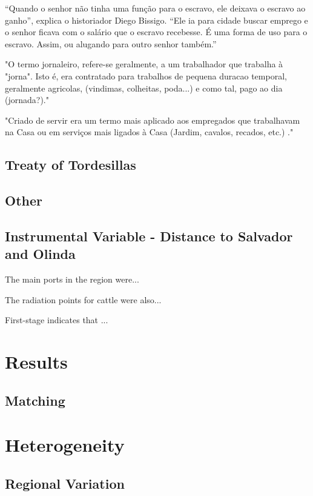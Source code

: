 \documentclass{article}
\begin{document}
“Quando o senhor não tinha uma função para o escravo, ele deixava o escravo ao ganho”, explica o historiador Diego Bissigo. “Ele ia para cidade buscar emprego e o senhor ficava com o salário que o escravo recebesse. É uma forma de uso para o escravo. Assim, ou alugando para outro senhor também.”

"O termo jornaleiro, refere-se geralmente, a um trabalhador que trabalha à "jorna". Isto é, era contratado para trabalhos de pequena duracao temporal, geralmente agricolas, (vindimas, colheitas, poda...) e como tal, pago ao dia (jornada?)."

"Criado de servir era um termo mais aplicado aos empregados que trabalhavam na Casa ou em serviços mais ligados à Casa (Jardim, cavalos, recados, etc.) ."

\parencite[p.~142]{De_Oliveira_Andrade1980-xz}

\subsection{Treaty of Tordesillas}

\subsection{Other}

\subsection{Instrumental Variable - Distance to Salvador and Olinda}

The main ports in the region were... 

The radiation points for cattle were also...

First-stage indicates that ...

\section{Results}

\subsection{Matching}

\section{Heterogeneity}

\subsection{Regional Variation}
\end{document}
